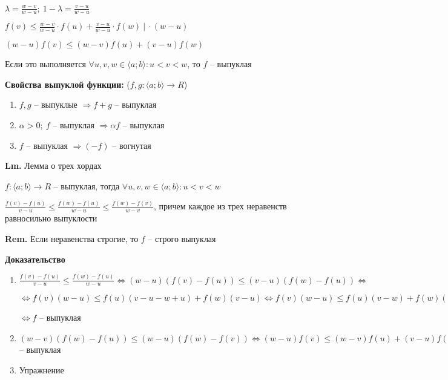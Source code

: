 \documentclass[14pt, letter paper]{article}
\newcommand{\q}[1]{\langle #1 \rangle}
\begin{document}
$\lambda = \frac{w - v}{w - u};\ 1 - \lambda = \frac{v - u}{w - u}$

$f(v) \leq \frac{w - v}{w - u} \cdot f(u) + \frac{v - u}{w - u} \cdot f(w)\ |\ \cdot (w - u)$

$(w - u)f(v) \leq (w - v)f(u) + (v - u)f(w)$

Если это выполняется $\forall u, v, w \in \q{a; b} : u < v < w$, то $f$ -- выпуклая

\vspace{20mm}

\textbf{Свойства выпуклой функции:} ($f, g : \q{a; b} \rightarrow R$)

\begin{enumerate}
    \item $f, g$ -- выпуклые $\Rightarrow f + g$ -- выпуклая
    \item $\alpha > 0;\ f$ -- выпуклая $\Rightarrow \alpha f$ -- выпуклая
    \item $f$ -- выпуклая $\Rightarrow (-f)$ -- вогнутая
\end{enumerate}

\vspace{5mm}

\textbf{Lm.} Лемма о трех хордах

$f: \q{a; b} \rightarrow R$ -- выпуклая, тогда $\forall u, v, w \in \q{a; b} : u < v < w$

$\frac{f(v) - f(u)}{v - u} \leq \frac{f(w) - f(u)}{w - u} \leq \frac{f(w) - f(v)}{w - v}$, причем каждое из трех неравенств равносильно выпуклости

\textbf{Rem.} Если неравенства строгие, то $f$ -- строго выпуклая

\begin{center}
    \textbf{Доказательство}
\end{center}

\begin{enumerate}
    \item $\frac{f(v) - f(u)}{v - u} \leq \frac{f(w) - f(u)}{w - u} \Leftrightarrow (w - u)(f(v) - f(u)) \leq (v - u)(f(w) - f(u)) \Leftrightarrow$
    
    $\Leftrightarrow f(v) (w - u) \leq f(u) (v - u - w + u) + f(w) (v - u) \Leftrightarrow f(v) (w - u) \leq f(u) (v - w) + f(w) (v - u) \Leftrightarrow$
    
    $\Leftrightarrow f$ -- выпуклая

    \item $(w - v)(f(w) - f(u)) \leq (w - u)(f(w) - f(v)) \Leftrightarrow (w - u)f(v) \leq (w - v)f(u) + (v - u)f(w) \Leftrightarrow f$ -- выпуклая
    
    \item Упражнение
\end{enumerate}
\end{document}

